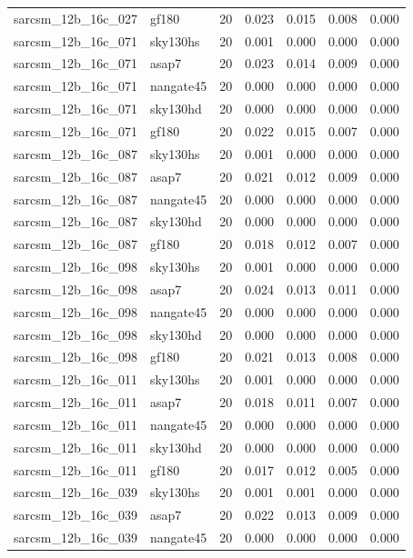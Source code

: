 \begin{tabular}{llrrrrr}
sarcsm\_12b\_16c\_027 & gf180 & 20 & 0.023 & 0.015 & 0.008 & 0.000 \\
sarcsm\_12b\_16c\_071 & sky130hs & 20 & 0.001 & 0.000 & 0.000 & 0.000 \\
sarcsm\_12b\_16c\_071 & asap7 & 20 & 0.023 & 0.014 & 0.009 & 0.000 \\
sarcsm\_12b\_16c\_071 & nangate45 & 20 & 0.000 & 0.000 & 0.000 & 0.000 \\
sarcsm\_12b\_16c\_071 & sky130hd & 20 & 0.000 & 0.000 & 0.000 & 0.000 \\
sarcsm\_12b\_16c\_071 & gf180 & 20 & 0.022 & 0.015 & 0.007 & 0.000 \\
sarcsm\_12b\_16c\_087 & sky130hs & 20 & 0.001 & 0.000 & 0.000 & 0.000 \\
sarcsm\_12b\_16c\_087 & asap7 & 20 & 0.021 & 0.012 & 0.009 & 0.000 \\
sarcsm\_12b\_16c\_087 & nangate45 & 20 & 0.000 & 0.000 & 0.000 & 0.000 \\
sarcsm\_12b\_16c\_087 & sky130hd & 20 & 0.000 & 0.000 & 0.000 & 0.000 \\
sarcsm\_12b\_16c\_087 & gf180 & 20 & 0.018 & 0.012 & 0.007 & 0.000 \\
sarcsm\_12b\_16c\_098 & sky130hs & 20 & 0.001 & 0.000 & 0.000 & 0.000 \\
sarcsm\_12b\_16c\_098 & asap7 & 20 & 0.024 & 0.013 & 0.011 & 0.000 \\
sarcsm\_12b\_16c\_098 & nangate45 & 20 & 0.000 & 0.000 & 0.000 & 0.000 \\
sarcsm\_12b\_16c\_098 & sky130hd & 20 & 0.000 & 0.000 & 0.000 & 0.000 \\
sarcsm\_12b\_16c\_098 & gf180 & 20 & 0.021 & 0.013 & 0.008 & 0.000 \\
sarcsm\_12b\_16c\_011 & sky130hs & 20 & 0.001 & 0.000 & 0.000 & 0.000 \\
sarcsm\_12b\_16c\_011 & asap7 & 20 & 0.018 & 0.011 & 0.007 & 0.000 \\
sarcsm\_12b\_16c\_011 & nangate45 & 20 & 0.000 & 0.000 & 0.000 & 0.000 \\
sarcsm\_12b\_16c\_011 & sky130hd & 20 & 0.000 & 0.000 & 0.000 & 0.000 \\
sarcsm\_12b\_16c\_011 & gf180 & 20 & 0.017 & 0.012 & 0.005 & 0.000 \\
sarcsm\_12b\_16c\_039 & sky130hs & 20 & 0.001 & 0.001 & 0.000 & 0.000 \\
sarcsm\_12b\_16c\_039 & asap7 & 20 & 0.022 & 0.013 & 0.009 & 0.000 \\
sarcsm\_12b\_16c\_039 & nangate45 & 20 & 0.000 & 0.000 & 0.000 & 0.000 \\

\end{tabular}
